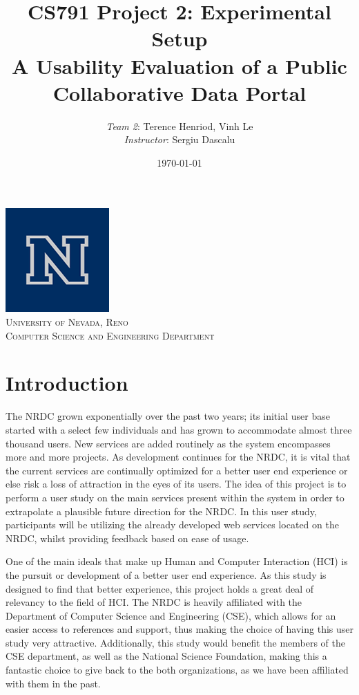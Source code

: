 \documentclass{article}
\title{CS791 Project 2: Experimental Setup \\ A Usability Evaluation of a Public Collaborative Data Portal}
\author{\emph{Team 2}: Terence Henriod, Vinh Le \\ \emph{Instructor}: Sergiu Dascalu}
\date{\today}
\begin{document}

\clearpage            %

\maketitle
\begin{center}
\includegraphics[scale=0.4]{unr-logo} \\[0.5cm]
\textsc{\Large University of Nevada, Reno} \\[0.5cm]
\textsc{\large Computer Science and Engineering Department} \\
\end{center}

\thispagestyle{empty} %

\vspace{10mm}

%
%
\newpage
\section{Introduction}
The NRDC grown exponentially over the past two years; its initial user base started with a select few individuals and has grown to accommodate almost three thousand users. New services are added routinely as the system encompasses more and more projects. As development continues for the NRDC, it is vital that the current services are continually optimized for a better user end experience or else risk a loss of attraction in the eyes of its users. The idea of this project is to perform a user study on the main services present within the system in order to extrapolate a plausible future direction for the NRDC. In this user study, participants will be utilizing the already developed web services located on the NRDC, whilst providing feedback based on ease of usage. 

One of the main ideals that make up Human and Computer Interaction (HCI) is the pursuit or development of a better user end experience. As this study is designed to find that better experience, this project holds a great deal of relevancy to the field of HCI. The NRDC is heavily affiliated with the Department of Computer Science and Engineering (CSE), which allows for an easier access to references and support, thus making the choice of having this user study very attractive. Additionally, this study would benefit the members of the CSE department, as well as the National Science Foundation, making this a fantastic choice to give back to the both organizations, as we have been affiliated with them in the past.
\end{document}
